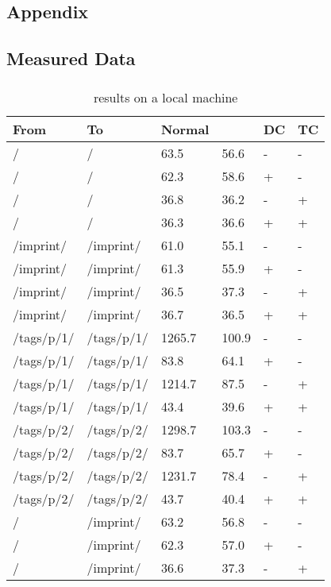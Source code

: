 
\begin{appendix}
\section{Appendix}
\subsection{Measured Data}
\subsubsection{\curl{}}
\begin{center}
\small
\begin{longtable}{llllll}
    \caption{\curl{} results on a local machine}
    \\
	\hline
	\textbf{From} & \textbf{To} & \textbf{Normal} & \textbf{\lare{}} & \textbf{DC} & \textbf{TC} \\
	\hline
/ & / & 63.5 & 56.6 & - & - \\
/ & / & 62.3 & 58.6 & + & - \\
/ & / & 36.8 & 36.2 & - & + \\
/ & / & 36.3 & 36.6 & + & + \\
\hline
/imprint/ & /imprint/ & 61.0 & 55.1 & - & - \\
/imprint/ & /imprint/ & 61.3 & 55.9 & + & - \\
/imprint/ & /imprint/ & 36.5 & 37.3 & - & + \\
/imprint/ & /imprint/ & 36.7 & 36.5 & + & + \\
\hline
/tags/p/1/ & /tags/p/1/ & 1265.7 & 100.9 & - & - \\
/tags/p/1/ & /tags/p/1/ & 83.8 & 64.1 & + & - \\
/tags/p/1/ & /tags/p/1/ & 1214.7 & 87.5 & - & + \\
/tags/p/1/ & /tags/p/1/ & 43.4 & 39.6 & + & + \\
\hline
/tags/p/2/ & /tags/p/2/ & 1298.7 & 103.3 & - & - \\
/tags/p/2/ & /tags/p/2/ & 83.7 & 65.7 & + & - \\
/tags/p/2/ & /tags/p/2/ & 1231.7 & 78.4 & - & + \\
/tags/p/2/ & /tags/p/2/ & 43.7 & 40.4 & + & + \\
\hline
\hline
/ & /imprint/ & 63.2 & 56.8 & - & - \\
/ & /imprint/ & 62.3 & 57.0 & + & - \\
/ & /imprint/ & 36.6 & 37.3 & - & + \\

\end{longtable}
\end{center}
\end{appendix}
